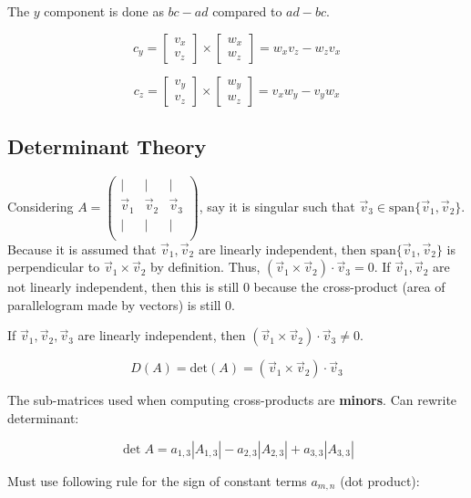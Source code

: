 The $y$ component is done as $bc-ad$ compared to $ad-bc$.

\[c_y=\begin{bmatrix}v_x\\ v_z\end{bmatrix}\times \begin{bmatrix}w_x\\ w_z\end{bmatrix}=w_xv_z-w_zv_x\]

\[c_z=\begin{bmatrix}v_y\\ v_z\end{bmatrix}\times \begin{bmatrix}w_y\\ w_z\end{bmatrix}=v_xw_y-v_yw_x\]

\subsection{Determinant Theory}

Considering $A=\begin{pmatrix}|&|&| \\\vec v_1 & \vec v_2 &\vec v_3 \\ |&|&| \\ \end{pmatrix}$,
say it is singular such that $\vec{v}_3\in \mathrm{span}\{\vec{v}_1,\vec{v}_2\}$. Because it is assumed that
$\vec{v}_1,\vec{v}_2$ are linearly independent, then $\mathrm{span}\{\vec{v}_1,\vec{v}_2\}$ is perpendicular to 
$\vec{v}_1\times \vec{v}_2$ by definition. Thus, $\boxed{(\vec{v}_1\times\vec{v}_2)\cdot \vec{v}_3=0}$.
If $\vec{v}_1,\vec{v}_2$ are not linearly independent, then this is still 0 because the cross-product (area of parallelogram made by vectors)
is still 0.

\noindent
If $\vec{v}_1,\vec{v}_2,\vec{v}_3$ are linearly independent, then $(\vec{v}_1\times\vec{v}_2)\cdot \vec{v}_3\neq0$.

\[\boxed{D(A)=\mathrm{det}(A)=(\vec{v}_1\times\vec{v}_2)\cdot \vec{v}_3}\]

\noindent
The sub-matrices used when computing cross-products are \textbf{minors}.
Can rewrite determinant:

\[\boxed{\det A= a_{1,3}\left|A_{1,3}\right|-a_{2,3}\left|A_{2,3}\right|+a_{3,3}\left|A_{3,3}\right|}\]

Must use following rule for the sign of constant terms $a_{m,n}$ (dot product):

